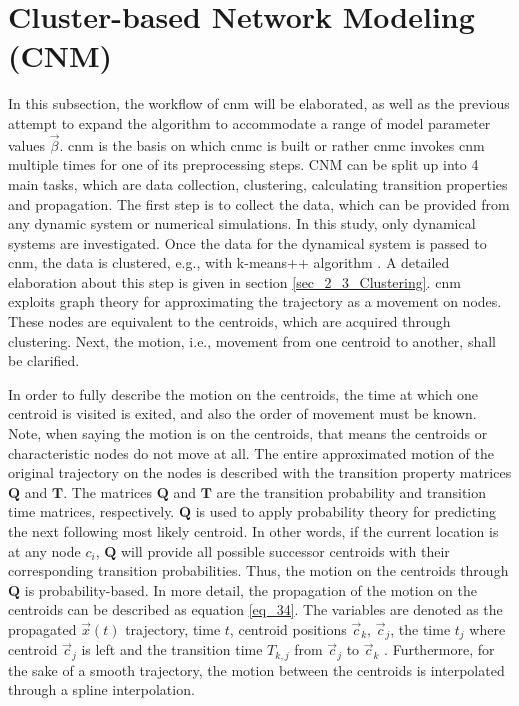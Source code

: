 \section{Cluster-based Network Modeling (CNM)}
\label{sec_1_1_2_CNM}
In this subsection, the workflow of \gls{cnm} \cite{Fernex2021} will be elaborated, as well as the previous attempt to expand the algorithm to accommodate a range of model parameter values $\vec{\beta}$.
\gls{cnm} \cite{Fernex2021} is the basis on which \gls{cnmc} is built or rather
\gls{cnmc} invokes \gls{cnm} multiple times for one of its preprocessing steps.
CNM can be split up into 4 main tasks, which are 
data collection, clustering, calculating 
transition properties and propagation.
The first step is to collect the data, which can be provided from any dynamic system or numerical simulations. 
In this study, only dynamical systems are investigated.
Once the data for the dynamical system is passed to \gls{cnm}, the data is clustered, e.g., with k-means++ algorithm \cite{Arthur2006}. 
A detailed elaboration about this step is given in section \ref{sec_2_3_Clustering}. \gls{cnm} exploits graph theory for approximating the trajectory as a movement on nodes. 
These nodes are equivalent to the centroids, which are acquired through clustering. 
Next, the motion, i.e., movement from one centroid to another, shall be clarified.\newline

In order to fully describe the motion on the centroids, the time at which 
one centroid is visited is exited, and also the order of movement must be known. 
Note, when saying the motion is on the centroids, that 
means the centroids or characteristic nodes do not move 
at all. The entire approximated motion of the original trajectory
on the nodes is described with the transition 
property matrices $\bm Q$ and $\bm T$.
The matrices $\bm Q$ and $\bm T$ are the transition probability and transition time matrices, respectively. 
$\bm Q$ is used to apply probability theory for predicting the next following most likely centroid. In other words, if 
the current location is at any node $c_i$, 
$\bm Q$ will provide all possible successor centroids 
with their corresponding transition probabilities.
Thus, the motion on the centroids 
through $\bm Q$ is probability-based.
In more detail, the propagation of the motion on the centroids can be described as equation \eqref{eq_34}. 
The variables are denoted as the propagated $\vec{x}(t)$ trajectory, time $t$, centroid positions $\vec{c}_k,\, \vec{c}_j$, the time $t_j$ where centroid $\vec{c}_j$ is left and the transition time $T_{k,j}$ from $\vec{c}_j$ to $\vec{c}_k$  \cite{Fernex2021}.
Furthermore, for the sake of a smooth trajectory, the motion between the centroids is interpolated through a spline interpolation.\newline

